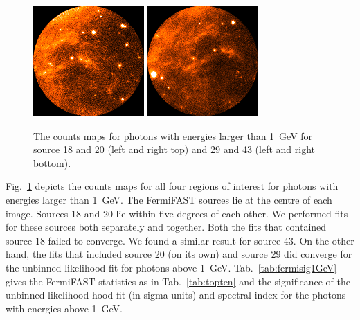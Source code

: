 \documentclass[useAMS,usenatbib]{mn2e}
\begin{document}
\begin{figure}
  \includegraphics[width=0.45\columnwidth]{src_29_1GeV}
  \includegraphics[width=0.45\columnwidth]{src_43_1GeV}
  \caption{The counts maps for photons with energies larger than 1~GeV
    for source 18 and 20 (left and right top) and 29 and 43 (left and
    right bottom).}
  \label{fig:1GeVcmap}
\end{figure}
Fig.~\ref{fig:1GeVcmap} depicts the counts maps for all four regions
of interest for photons with energies larger than 1~GeV.  The
FermiFAST sources lie at the centre of each image. Sources 18 and 20
lie within five degrees of each other.  We performed fits for these
sources both separately and together.  Both the fits that contained
source 18 failed to converge.  We found a similar result for source
43.  On the other hand, the fits that included source 20 (on its own)
and source 29 did converge for the unbinned likelihood fit for
photons above 1~GeV. Tab.~\ref{tab:fermisig1GeV} gives the FermiFAST
statistics as in Tab.~\ref{tab:topten} and the significance of the
unbinned likelihood hood fit (in sigma units) and spectral index for
the photons with energies above 1~GeV.
\end{document}
